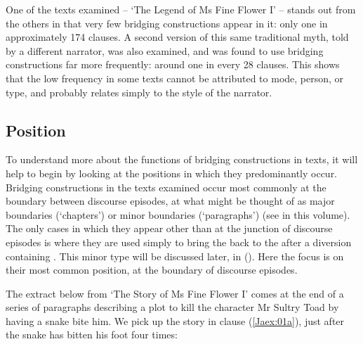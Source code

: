 \documentclass[output=paper]{LSP/langsci}
\begin{document}
One of the texts examined – `The Legend of Ms Fine Flower I' – stands out from the others in that very few bridging constructions appear in it: only one in approximately 174 clauses. A second version of this same traditional myth, told by a different narrator, was also examined, and was found to use bridging constructions far more frequently: around one in every 28 clauses. This shows that the low frequency in some texts cannot be attributed to  mode, person, or type, and probably relates simply to the style of the narrator.

%
\subsection{Position}
\label{JaPosition}
To understand more about the functions of bridging constructions in  texts, it will help to begin by looking at the positions in which they predominantly occur. Bridging constructions in the texts examined occur most commonly at the boundary between discourse episodes, at what might be thought of as major boundaries (`chapters') or minor boundaries (`paragraphs') (see \citeauthor{guerin18} in this volume). The only cases in which they appear other than at the junction of discourse episodes is where they are used simply to bring the  back to the  after a diversion containing . This minor type will be discussed later, in (). Here the focus is on their most common position, at the boundary of discourse episodes.
 
The extract below from `The Story of Ms Fine Flower I' comes at the end of a series of paragraphs describing a plot to kill the character Mr Sultry Toad by having a snake bite him. We pick up the story in clause (\ref{Jaex:01a}), just after the snake has bitten his foot four times:
 
\end{document}
